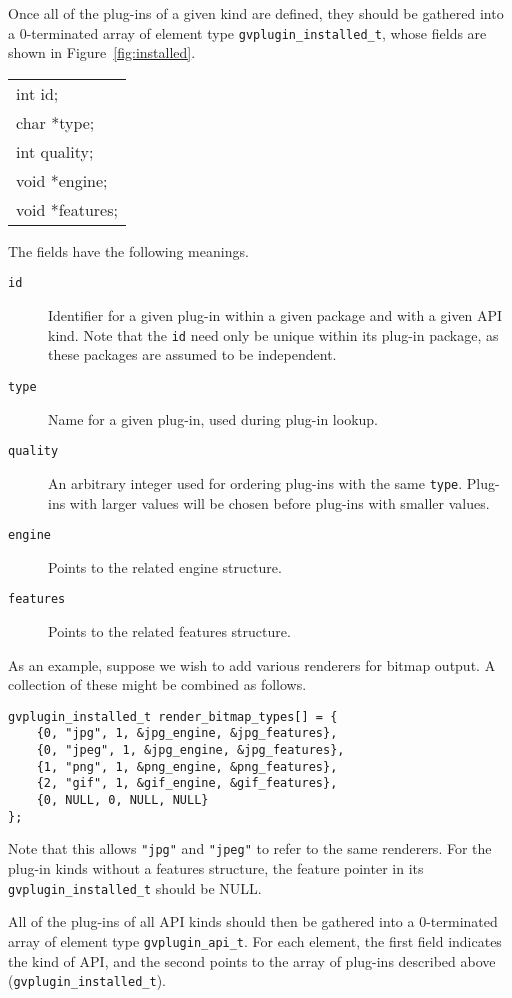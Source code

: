 Once all of the plug-ins of a given kind are defined, they should be
gathered into a 0-terminated array of element type {\tt gvplugin\_installed\_t},
whose fields are shown in Figure~\ref{fig:installed}.
\begin{figure*}[htb]
\centering
\begin{tabular}{|l|} \hline
int id; \\
char *type; \\
int quality; \\
void *engine; \\
void *features; \\
\hline
\end{tabular}
\caption{Plug-in fields}
\label{fig:installed}
\end{figure*}
The fields have the following meanings.
\begin{description}
\item[{\tt id}]
Identifier for a given plug-in within a given package and with
a given API kind. Note that the {\tt id} need only be unique within
its plug-in package, as these packages are assumed to be independent.
\item[{\tt type}]
Name for a given plug-in, used during plug-in lookup.
\item[{\tt quality}]
An arbitrary integer used for ordering plug-ins with the same {\tt type}.
Plug-ins with larger values will be chosen before plug-ins with smaller
values.
\item[{\tt engine}]
Points to the related engine structure.
\item[{\tt features}]
Points to the related features structure.
\end{description}

As an example, suppose we wish to add various renderers for
bitmap output. A collection of these might be combined as follows.
\begin{verbatim}
gvplugin_installed_t render_bitmap_types[] = {
    {0, "jpg", 1, &jpg_engine, &jpg_features},
    {0, "jpeg", 1, &jpg_engine, &jpg_features},
    {1, "png", 1, &png_engine, &png_features},
    {2, "gif", 1, &gif_engine, &gif_features},
    {0, NULL, 0, NULL, NULL}
};
\end{verbatim}
Note that this allows {\tt "jpg"} and {\tt "jpeg"} to refer to the
same renderers.
For the plug-in kinds without a features structure, the feature pointer in its
{\tt gvplugin\_installed\_t} should be NULL.

All of the plug-ins of all API kinds should then be
gathered into a 0-terminated array of element type {\tt gvplugin\_api\_t}.
For each element, 
the first field indicates the kind of API, and the second points to the
array of plug-ins described above ({\tt gvplugin\_installed\_t}).
  
